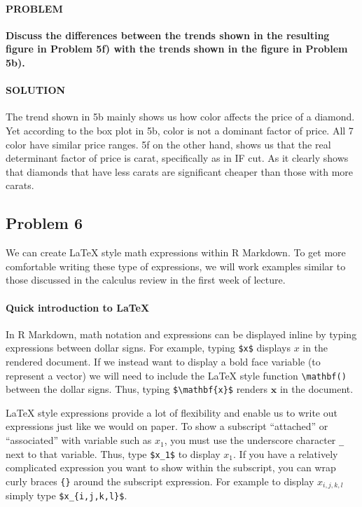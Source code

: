 \documentclass[]{article}
\let\oldparagraph\paragraph
\renewcommand{\paragraph}[1]{\oldparagraph{#1}\mbox{}}
\begin{document}
\hypertarget{problem-30}{%
\paragraph{PROBLEM}\label{problem-30}}

\textbf{Discuss the differences between the trends shown in the
resulting figure in Problem 5f) with the trends shown in the figure in
Problem 5b).}

\hypertarget{solution-29}{%
\paragraph{SOLUTION}\label{solution-29}}

The trend shown in 5b mainly shows us how color affects the price of a
diamond. Yet according to the box plot in 5b, color is not a dominant
factor of price. All 7 color have similar price ranges. 5f on the other
hand, shows us that the real determinant factor of price is carat,
specifically as in IF cut. As it clearly shows that diamonds that have
less carats are significant cheaper than those with more carats.

\hypertarget{problem-6-1}{%
\subsection{Problem 6}\label{problem-6-1}}

We can create LaTeX style math expressions within R Markdown. To get
more comfortable writing these type of expressions, we will work
examples similar to those discussed in the calculus review in the first
week of lecture.

\hypertarget{quick-introduction-to-latex}{%
\paragraph{Quick introduction to
LaTeX}\label{quick-introduction-to-latex}}

In R Markdown, math notation and expressions can be displayed inline by
typing expressions between dollar signs. For example, typing
\texttt{\$x\$} displays \(x\) in the rendered document. If we instead
want to display a bold face variable (to represent a vector) we will
need to include the LaTeX style function
\texttt{\textbackslash{}mathbf()} between the dollar signs. Thus, typing
\texttt{\$\textbackslash{}mathbf\{x\}\$} renders \(\mathbf{x}\) in the
document.

LaTeX style expressions provide a lot of flexibility and enable us to
write out expressions just like we would on paper. To show a subscript
``attached'' or ``associated'' with variable such as \(x_1\), you must
use the underscore character \texttt{\_} next to that variable. Thus,
type \texttt{\$x\_1\$} to display \(x_1\). If you have a relatively
complicated expression you want to show within the subscript, you can
wrap curly braces \texttt{\{\}} around the subscript expression. For
example to display \(x_{i,j,k,l}\) simply type
\texttt{\$x\_\{i,j,k,l\}\$}.
\end{document}
